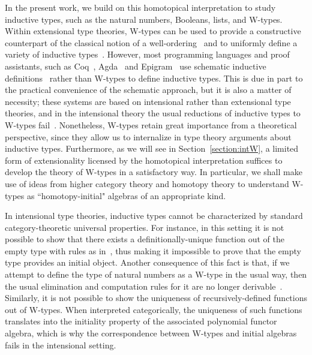 \documentclass[11pt]{article}
\theoremstyle{definition}
\begin{document}
In the present work, we build on this homotopical interpretation to study inductive types, such as the natural numbers, Booleans, lists, and W-types. Within extensional type theories, W-types can be used to  provide a constructive counterpart of the classical notion of a well-ordering~\cite{MartinLofP:inttt} and to uniformly define a variety of inductive types~\cite{DybjerP:repids}.
However, most programming languages and proof assistants, such as Coq~\cite{BertotY:inttpp}, Agda~\cite{NorellU:towppl} and Epigram~\cite{McBrideC:viefl} use schematic inductive definitions~\cite{CoquandT:inddt,PaulinMorhringC:inddsc} rather than W-types to define inductive types.  This is due in part to the practical convenience of the schematic approach, but it is also a matter of necessity; these systems are based on intensional rather than extensional type theories, and in the intensional theory the usual reductions of inductive types to W-types fail~\cite{DybjerP:repids,McBrideC:wtygnb}.
Nonetheless, W-types retain great importance from a theoretical perspective, since they allow us to internalize in type theory arguments about inductive types. Furthermore, as we will see in Section~\ref{section:intW}, a limited form of extensionality licensed by the homotopical interpretation suffices to develop the theory of W-types in a satisfactory way. In particular, we shall make use of ideas from higher category theory and homotopy theory to understand W-types as ``homotopy-initial" algebras of an appropriate kind.

\newpage

In intensional type theories, inductive types cannot be characterized by standard category-theoretic
universal properties. For instance, in this setting it is not possible to show that there exists a 
definitionally-unique function out of the empty type with rules as in~\cite[Section~5.2]{NordstromB:marltt}, thus making it impossible to prove that the empty type provides an initial object. 
Another consequence of this fact is that, if we attempt to define the type of 
natural numbers as a W-type in the usual way, then 
the usual elimination and computation rules for it are no longer derivable~\cite{DybjerP:repids}. Similarly, it is not possible to show the uniqueness of recursively-defined functions out of W-types. When interpreted categorically, the uniqueness of such functions translates into the initiality property of the associated polynomial functor algebra, which is why the correspondence between W-types and initial algebras fails in the intensional setting.
\end{document}
